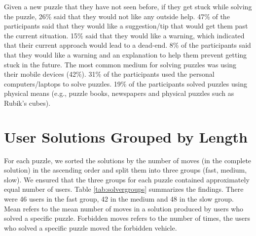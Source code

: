 Given a new puzzle that they have not seen before, if they get stuck while solving the puzzle, 26\% said that they would not like any outside help. 47\% of the participants said that they would like a suggestion/tip that would get them past the current situation. 15\% said that they would like a warning, which indicated that their current approach would lead to a dead-end. 8\% of the participants said that they would like a warning and an explanation to help them prevent getting stuck in the future.  The most common medium for solving puzzles was using their mobile devices (42\%). 31\% of the participants used the personal computers/laptops to solve puzzles. 19\% of the participants solved puzzles using physical means (e.g., puzzle books, newspapers and physical puzzles such as Rubik's  cubes).\\

\section{User Solutions Grouped by Length}
\label{ap:lengroups}
For each puzzle, we sorted the solutions by the number of moves (in the complete solution) in the ascending order and split them into three groups (fast, medium, slow). We ensured that the three groups for each puzzle contained approximately equal number of users. Table \ref{tab:solvergroups} summarizes the findings. There were 46 users in the fast group, 42 in the medium and 48 in the slow group. Mean refers to the mean number of moves in a solution produced by users who solved a specific puzzle. Forbidden moves refers to the number of times, the users who solved a specific puzzle moved the forbidden vehicle.

